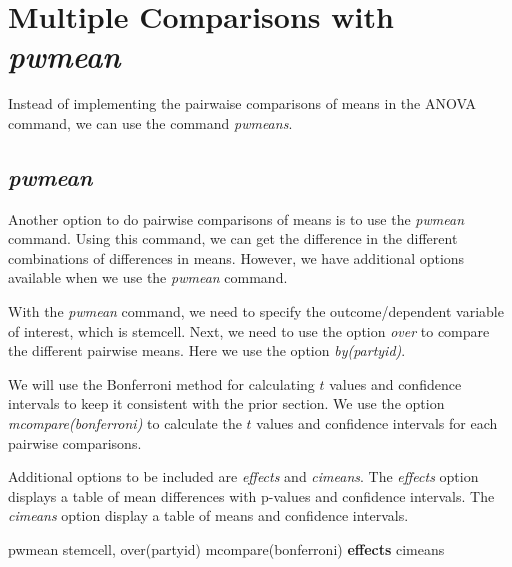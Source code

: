 \documentclass[
]{book}
\newenvironment{Shaded}{\begin{snugshade}}{\end{snugshade}}
\newcommand{\BaseNTok}[1]{\textcolor[rgb]{0.00,0.00,0.81}{#1}}
\newcommand{\KeywordTok}[1]{\textcolor[rgb]{0.13,0.29,0.53}{\textbf{#1}}}
\newcommand{\NormalTok}[1]{#1}
\begin{document}
\chapter{\texorpdfstring{Multiple Comparisons with \emph{pwmean}}{Multiple Comparisons with pwmean}}\label{multiple-comparisons-with-pwmean}

Instead of implementing the pairwaise comparisons of means in the ANOVA command, we can use the command \emph{pwmeans}.

\section{\texorpdfstring{\emph{pwmean}}{pwmean}}\label{pwmean}

Another option to do pairwise comparisons of means is to use the \emph{pwmean} command. Using this command, we can get the difference in the different combinations of differences in means. However, we have additional options available when we use the \emph{pwmean} command.

With the \emph{pwmean} command, we need to specify the outcome/dependent variable of interest, which is stemcell. Next, we need to use the option \emph{over} to compare the different pairwise means. Here we use the option \emph{by(partyid)}.

We will use the Bonferroni method for calculating \(t\) values and confidence intervals to keep it consistent with the prior section. We use the option \emph{mcompare(bonferroni)} to calculate the \(t\) values and confidence intervals for each pairwise comparisons.

Additional options to be included are \emph{effects} and \emph{cimeans}. The \emph{effects} option displays a table of mean differences with p-values and confidence intervals. The \emph{cimeans} option display a table of means and confidence intervals.

\begin{Shaded}
\begin{Highlighting}[]
\NormalTok{pwmean stemcell, }\BaseNTok{over}\NormalTok{(partyid) mcompare(bonferroni) }\KeywordTok{effects}\NormalTok{ cimeans }
\end{Highlighting}
\end{Shaded}
\end{document}
